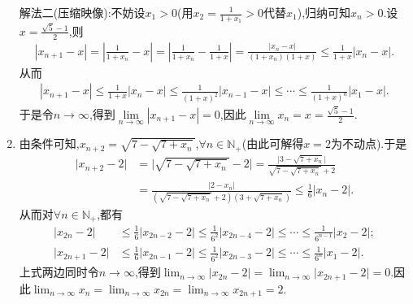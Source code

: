 \documentclass[lang=cn,newtx,10pt,scheme=chinese]{elegantbook}
\begin{document}
\begin{solution}
\begin{enumerate}
{\color{blue}解法二(压缩映像):}不妨设$x_1>0$(用$x_2=\frac{1}{1+x_1}>0$代替$x_1$),归纳可知$x_n>0$.设$x=\frac{\sqrt{5}-1}{2}$,则
\begin{align*}
\left| x_{n+1}-x \right|=\left| \frac{1}{1+x_n}-x \right|=\left| \frac{1}{1+x_n}-\frac{1}{1+x} \right|=\frac{\left| x_n-x \right|}{\left( 1+x_n \right) \left( 1+x \right)}\leqslant \frac{1}{1+x}\left| x_n-x \right|.
\end{align*}
从而
\begin{align*}
\left| x_{n+1}-x \right|\leqslant \frac{1}{1+x}\left| x_n-x \right|\leqslant \frac{1}{\left( 1+x \right) ^2}\left| x_{n-1}-x \right|\leqslant \cdots \leqslant \frac{1}{\left( 1+x \right) ^n}\left| x_1-x \right|.
\end{align*}
于是令$n\to\infty$,得到$\underset{n\rightarrow \infty}{\lim}\left| x_{n+1}-x \right|=0$,因此$\underset{n\rightarrow \infty}{\lim}x_n=x=\frac{\sqrt{5}-1}{2}$.

\item 由条件可知,\(x_{n + 2}=\sqrt{7-\sqrt{7 + x_n}}\),\(\forall n\in\mathbb{N}_+\)(由此可解得\(x = 2\)为不动点).于是
\begin{align*}
\vert x_{n + 2}-2\vert&=\vert\sqrt{7-\sqrt{7 + x_n}}-2\vert
=\frac{\vert 3-\sqrt{7 + x_n}\vert}{\sqrt{7-\sqrt{7 + x_n}}+2}\\
&=\frac{\vert 2 - x_n\vert}{(\sqrt{7-\sqrt{7 + x_n}}+2)(3+\sqrt{7 + x_n})}
\leqslant\frac{1}{6}\vert x_n - 2\vert.
\end{align*}
从而对$\forall n \in \mathbb{N}_+$,都有
\begin{align*}
\vert x_{2n}-2\vert&\leqslant\frac{1}{6}\vert x_{2n - 2}-2\vert\leqslant\frac{1}{6^2}\vert x_{2n - 4}-2\vert\leqslant\cdots\leqslant\frac{1}{6^{n - 1}}\vert x_2 - 2\vert;\\
\vert x_{2n + 1}-2\vert&\leqslant\frac{1}{6}\vert x_{2n - 1}-2\vert\leqslant\frac{1}{6^2}\vert x_{2n - 3}-2\vert\leqslant\cdots\leqslant\frac{1}{6^n}\vert x_1 - 2\vert.
\end{align*}
上式两边同时令\(n\rightarrow\infty\),得到\(\lim_{n\rightarrow\infty}\vert x_{2n}-2\vert=\lim_{n\rightarrow\infty}\vert x_{2n + 1}-2\vert = 0\).因此\(\lim_{n\rightarrow\infty}x_n=\lim_{n\rightarrow\infty}x_{2n}=\lim_{n\rightarrow\infty}x_{2n + 1}=2\).
\end{enumerate}
\end{solution}
\end{document}
